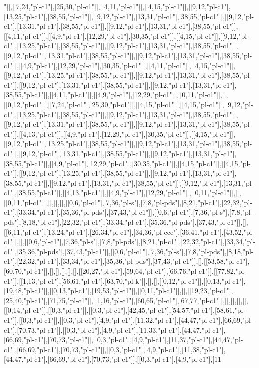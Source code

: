 "]],[[7,24,"pl-c1"],[25,30,"pl-c1"]],[[4,11,"pl-c1"]],[[4,15,"pl-c1"]],[[9,12,"pl-c1"],[13,25,"pl-c1"],[38,55,"pl-c1"]],[[9,12,"pl-c1"],[13,31,"pl-c1"],[38,55,"pl-c1"]],[[9,12,"pl-c1"],[13,31,"pl-c1"],[38,55,"pl-c1"]],[[9,12,"pl-c1"],[13,31,"pl-c1"],[38,55,"pl-c1"]],[[4,11,"pl-c1"]],[[4,9,"pl-c1"],[12,29,"pl-c1"],[30,35,"pl-c1"]],[[4,15,"pl-c1"]],[[9,12,"pl-c1"],[13,25,"pl-c1"],[38,55,"pl-c1"]],[[9,12,"pl-c1"],[13,31,"pl-c1"],[38,55,"pl-c1"]],[[9,12,"pl-c1"],[13,31,"pl-c1"],[38,55,"pl-c1"]],[[9,12,"pl-c1"],[13,31,"pl-c1"],[38,55,"pl-c1"]],[[4,9,"pl-c1"],[12,29,"pl-c1"],[30,35,"pl-c1"]],[[4,11,"pl-c1"]],[[4,15,"pl-c1"]],[[9,12,"pl-c1"],[13,25,"pl-c1"],[38,55,"pl-c1"]],[[9,12,"pl-c1"],[13,31,"pl-c1"],[38,55,"pl-c1"]],[[9,12,"pl-c1"],[13,31,"pl-c1"],[38,55,"pl-c1"]],[[9,12,"pl-c1"],[13,31,"pl-c1"],[38,55,"pl-c1"]],[[4,11,"pl-c1"]],[[4,9,"pl-c1"],[12,29,"pl-c1"]],[[0,11,"pl-c1"]],[],[[0,12,"pl-c1"]],[[7,24,"pl-c1"],[25,30,"pl-c1"]],[[4,15,"pl-c1"]],[[4,15,"pl-c1"]],[[9,12,"pl-c1"],[13,25,"pl-c1"],[38,55,"pl-c1"]],[[9,12,"pl-c1"],[13,31,"pl-c1"],[38,55,"pl-c1"]],[[9,12,"pl-c1"],[13,31,"pl-c1"],[38,55,"pl-c1"]],[[9,12,"pl-c1"],[13,31,"pl-c1"],[38,55,"pl-c1"]],[[4,13,"pl-c1"]],[[4,9,"pl-c1"],[12,29,"pl-c1"],[30,35,"pl-c1"]],[[4,15,"pl-c1"]],[[9,12,"pl-c1"],[13,25,"pl-c1"],[38,55,"pl-c1"]],[[9,12,"pl-c1"],[13,31,"pl-c1"],[38,55,"pl-c1"]],[[9,12,"pl-c1"],[13,31,"pl-c1"],[38,55,"pl-c1"]],[[9,12,"pl-c1"],[13,31,"pl-c1"],[38,55,"pl-c1"]],[[4,9,"pl-c1"],[12,29,"pl-c1"],[30,35,"pl-c1"]],[[4,15,"pl-c1"]],[[4,15,"pl-c1"]],[[9,12,"pl-c1"],[13,25,"pl-c1"],[38,55,"pl-c1"]],[[9,12,"pl-c1"],[13,31,"pl-c1"],[38,55,"pl-c1"]],[[9,12,"pl-c1"],[13,31,"pl-c1"],[38,55,"pl-c1"]],[[9,12,"pl-c1"],[13,31,"pl-c1"],[38,55,"pl-c1"]],[[4,13,"pl-c1"]],[[4,9,"pl-c1"],[12,29,"pl-c1"]],[[0,11,"pl-c1"]],[],[[0,11,"pl-c1"]],[],[],[],[[0,6,"pl-c1"],[7,36,"pl-s"],[7,8,"pl-pds"],[8,21,"pl-c1"],[22,32,"pl-c1"],[33,34,"pl-c1"],[35,36,"pl-pds"],[37,43,"pl-c1"]],[[0,6,"pl-c1"],[7,36,"pl-s"],[7,8,"pl-pds"],[8,18,"pl-c1"],[22,32,"pl-c1"],[33,34,"pl-c1"],[35,36,"pl-pds"],[37,43,"pl-c1"]],[],[[6,11,"pl-c1"],[13,24,"pl-c1"],[26,34,"pl-c1"],[34,36,"pl-cce"],[36,41,"pl-c1"],[43,52,"pl-c1"]],[],[[0,6,"pl-c1"],[7,36,"pl-s"],[7,8,"pl-pds"],[8,21,"pl-c1"],[22,32,"pl-c1"],[33,34,"pl-c1"],[35,36,"pl-pds"],[37,43,"pl-c1"]],[[0,6,"pl-c1"],[7,36,"pl-s"],[7,8,"pl-pds"],[8,18,"pl-c1"],[22,32,"pl-c1"],[33,34,"pl-c1"],[35,36,"pl-pds"],[37,43,"pl-c1"]],[],[[53,58,"pl-c1"],[60,70,"pl-c1"]],[],[],[],[],[],[[20,27,"pl-c1"],[59,64,"pl-c1"],[66,76,"pl-c1"]],[[77,82,"pl-c1"]],[[1,13,"pl-c1"],[56,61,"pl-c1"],[63,70,"pl-k"]],[],[],[[0,12,"pl-c1"]],[[0,13,"pl-c1"],[19,48,"pl-c1"]],[[0,13,"pl-c1"],[19,53,"pl-c1"]],[[0,11,"pl-c1"]],[],[[19,23,"pl-c1"],[25,40,"pl-c1"],[71,75,"pl-c1"]],[[1,16,"pl-c1"],[60,65,"pl-c1"],[67,77,"pl-c1"]],[],[],[],[],[[0,14,"pl-c1"]],[[0,3,"pl-c1"]],[[0,3,"pl-c1"],[42,45,"pl-c1"],[54,57,"pl-c1"],[58,61,"pl-c1"]],[[0,3,"pl-c1"]],[[0,3,"pl-c1"],[4,9,"pl-c1"],[11,32,"pl-c1"],[44,47,"pl-c1"],[66,69,"pl-c1"],[70,73,"pl-c1"]],[[0,3,"pl-c1"],[4,9,"pl-c1"],[11,33,"pl-c1"],[44,47,"pl-c1"],[66,69,"pl-c1"],[70,73,"pl-c1"]],[[0,3,"pl-c1"],[4,9,"pl-c1"],[11,37,"pl-c1"],[44,47,"pl-c1"],[66,69,"pl-c1"],[70,73,"pl-c1"]],[[0,3,"pl-c1"],[4,9,"pl-c1"],[11,38,"pl-c1"],[44,47,"pl-c1"],[66,69,"pl-c1"],[70,73,"pl-c1"]],[[0,3,"pl-c1"],[4,9,"pl-c1"],[11